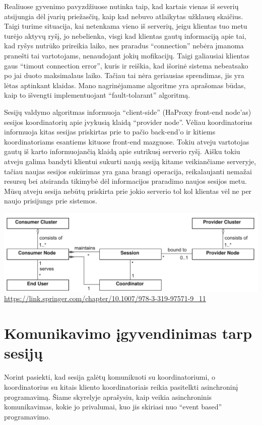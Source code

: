 \documentclass{VUMIFPSkursinis}
\begin{document}
Realiuose gyvenimo pavyzdžiuose nutinka taip, kad kartais vienas iš severių atsijungia dėl įvarių priežasčių, kaip kad nebuvo atlaikytas užklausų skaičius. Taigi turime situacija, kai netenkama vieno iš serverių, jeigu klientas tuo metu turėjo aktyvų ryšį, jo nebelienka, visgi kad klientas gautų informaciją apie tai, kad ryšys nutrūko prireikia laiko, nes praradus “connection” nebėra įmanoma pranešti tai vartotojams, nenaudojant jokių mofikacijų. Taigi galiausiai klientas gaus “timout connection error”, kuris ir reiškia, kad išorinė sistema nebeatsako po jai duoto maksimalaus laiko. Tačiau tai nėra geriausias sprendimas, jis yra lėtas aptinkant klaidas. Mano nagrinėjamame algoritme yra aprašomas būdas, kaip to išvengti implementuojant “fault-tolarant” algoritmą.
 
Sesijų valdymo algoritmas informuoja “client-side” (HaProxy front-end node’as) sesijos koordinatorių apie įvykusią klaidą “provider node”. Vėliau koordinatorius informuoja kitas sesijas priskirtas prie to pačio back-end’o ir kitiems koordinatoriams esantiems kituose front-end mazguose. Tokiu atveju vartotojas gautų iš karto informuojančią klaidą apie sutrikusį serverio ryšį. Aišku tokiu atveju galima bandyti klientui sukurti naują sesiją kitame veikiančiame serveryje, tačiau naujas sesijos sukūrimas yra gana brangi operacija, reikalaujanti nemažai resursų bei atsiranda tikimybė dėl informacijos praradimo naujos sesijos metu. Mūsų atveju sesija nebūtų priskirta prie jokio serverio tol kol klientas vėl ne per  naujo prisijungs prie sistemos.

\graphicspath{ {./img/} }
 \includegraphics[width=150mm,scale=0.5]{structure}
\url {https://link.springer.com/chapter/10.1007/978-3-319-97571-9_11}

\section{Komunikavimo įgyvendinimas tarp sesijų}
Norint pasiekti, kad sesija galėtų komunikuoti su koordinatoriumi, o koordinatorius su kitais kliento koordinatoriais reikia pasitelkti asinchroninį programavimą.
Šiame skyrelyje aprašysiu, kaip veikia asinchroninis komunikavimas, kokie jo privalumai, kuo jis skiriasi nuo “event based” programavimo.
\end{document}
